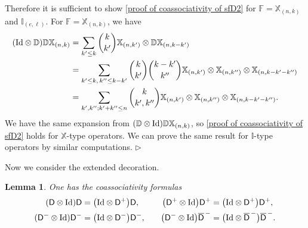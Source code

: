 \documentclass[10pt, reqno]{amsart}
\numberwithin{subsection}{section}
\numberwithin{subsubsection}{subsection}
\numberwithin{equation}{section} %
\newenvironment{Dem}[1][\unskip]{%
    \begin{list}{\hspace{1.15cm}{\sf \textbf{{\small Proof #1 --}}}}{%
        \setlength{\topsep}{0pt}%
        \setlength{\leftmargin}{0pt}%
        \setlength{\rightmargin}{0pt}%
        \setlength{\listparindent}{0pt}%
        \setlength{\itemindent}{0pt}%
        \setlength{\parsep}{0pt}%
        \addtolength{\leftmargin}{0pt}%
        \addtolength{\rightmargin}{0pt}%
    } \item }{\hfill $\rhd$\end{list}\smallskip}
\theoremstyle{mystyle}
\newtheorem{lem}[thm]{\hspace{-0.14cm}  {Lemma} }%
\theoremstyle{mystyle2}
\theoremstyle{mystyle3}
\newcommand{\iden}{\text{\rm Id}}
\newcommand{\bbF}{\mathbb{F}}
\newcommand{\bbD}{\mathbb{D}}
\newcommand{\sfD}{\mathsf{D}}
\newcommand\bbI{\mathbb{I}}
\newcommand{\bbX}{\mathbb{X}}
\begin{document}
\begin{Dem}
Therefore it is sufficient to show \eqref{proof of coassociativity of sfD2} for $\bbF=\bbX_{(n,k)}$ and $\bbI_{(e,\ell)}$. For $\bbF=\bbX_{(n,k)}$, we have
\begin{align*}
(\iden\otimes\bbD)\bbD\bbX_{(n,k)}&=\sum_{k'\le k}\binom{k}{k'}\bbX_{(n,k')}\otimes\bbD\bbX_{(n,k-k')}\\
&=\sum_{k'\le k,\, k''\le k-k'}\binom{k}{k'}\binom{k-k'}{k''}\bbX_{(n,k')}\otimes\bbX_{(n,k'')}\otimes\bbX_{(n,k-k'-k'')}\\
&=\sum_{k',k'';k'+k''\le n}\binom{k}{k',k''}\bbX_{(n,k')}\otimes\bbX_{(n,k'')}\otimes\bbX_{(n,k-k'-k'')}.
\end{align*}
We have the same expansion from $(\bbD\otimes\iden)\bbD\bbX_{(n,k)}$, so \eqref{proof of coassociativity of sfD2} holds for $\bbX$-type operators.
We can prove the same result for $\bbI$-type operators by similar computations.
\end{Dem}

\medskip

Now we consider the extended decoration.


\medskip

\begin{lem}\label{proof of coassociativity bsD}
One has the coassociativity formulas
$$
\begin{aligned}
(\sfD\otimes\text{\rm Id})\sfD &= \big(\text{\rm Id}\otimes\sfD^+\big)\sfD,   
&\big(\sfD^+\otimes\text{\rm Id}\big)\sfD^+ &= \big(\text{\rm Id}\otimes\sfD^+\big)\sfD^+,   \\
(\sfD^-\otimes\text{\rm Id})\sfD^- &= \big(\text{\rm Id}\otimes\sfD^-\big)\sfD^-,   \quad
&\big(\sfD^-\otimes\text{\rm Id}\big)\overline{\sfD}^{\,-} &= \big(\text{\rm Id}\otimes\overline{\sfD}^{\,-}\big)\overline{\sfD}^{\,-}.
\end{aligned}
$$
\end{lem}

\medskip
\end{document}
